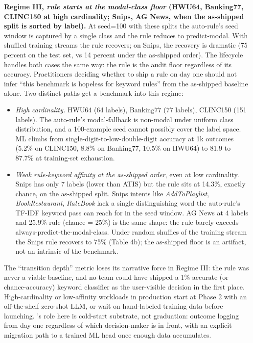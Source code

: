 \textbf{Regime III, \emph{rule starts at the modal-class floor} (HWU64,
Banking77, CLINC150 at high cardinality; Snips, AG News, when the
as-shipped split is sorted by label).} At seed=100 with these splits the
auto-rule's seed window is captured by a single class and the rule
reduces to predict-modal. With shuffled training streams the rule
recovers; on Snips, the recovery is dramatic (75 percent on the test
set, vs 14 percent under the as-shipped order). The lifecycle handles
both cases the same way: the rule is the audit floor regardless of its
accuracy. Practitioners deciding whether to ship a rule on day one
should not infer ``this benchmark is hopeless for keyword rules'' from
the as-shipped baseline alone. Two distinct paths get a benchmark into
this regime:

\begin{itemize}
\tightlist
\item
  \emph{High cardinality.} HWU64 (64 labels), Banking77 (77 labels),
  CLINC150 (151 labels). The auto-rule's modal-fallback is non-modal
  under uniform class distribution, and a 100-example seed cannot
  possibly cover the label space. ML climbs from
  single-digit-to-low-double-digit accuracy at 1k outcomes (5.2\% on
  CLINC150, 8.8\% on Banking77, 10.5\% on HWU64) to 81.9 to 87.7\% at
  training-set exhaustion.
\item
  \emph{Weak rule-keyword affinity at the as-shipped order}, even at low
  cardinality. Snips has only 7 labels (lower than ATIS) but the rule
  sits at 14.3\%, exactly chance, on the as-shipped split. Snips intents
  like \emph{AddToPlaylist}, \emph{BookRestaurant}, \emph{RateBook} lack
  a single distinguishing word the auto-rule's TF-IDF keyword pass can
  reach for in the seed window. AG News at 4 labels and 25.9\% rule
  (chance = 25\%) is the same shape: the rule barely exceeds
  always-predict-the-modal-class. Under random shuffles of the training
  stream the Snips rule recovers to 75\% (Table 4b); the as-shipped
  floor is an artifact, not an intrinsic of the benchmark.
\end{itemize}

The ``transition depth'' metric loses its narrative force in Regime III:
the rule was never a viable baseline, and no team could have shipped a
1\%-accurate (or chance-accuracy) keyword classifier as the user-visible
decision in the first place. High-cardinality or low-affinity workloads
in production start at Phase 2 with an off-the-shelf zero-shot LLM, or
wait on hand-labeled training data before launching. \sysname{}'s role
here is cold-start substrate, not graduation: outcome logging from day
one regardless of which decision-maker is in front, with an explicit
migration path to a trained ML head once enough data accumulates.

